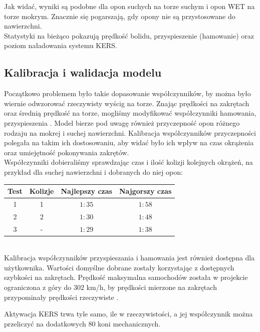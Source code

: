 \documentclass{article}
\begin{document}
Jak widać, wyniki są podobne dla opon suchych na torze suchym i opon WET na torze mokrym. Znacznie się pogarszają, gdy opony nie są przystosowane do nawierzchni. \\

Statystyki na bieżąco pokazują prędkość bolidu, przyspieszenie (hamowanie) oraz poziom naładowania systemu KERS.

\subsection{Kalibracja i walidacja modelu}

Początkowo problemem było takie dopasowanie współczynników, by można było wiernie odwzorować rzeczywisty wyścig na torze. Znając prędkości na zakrętach oraz średnią prędkość na torze, mogliśmy modyfikować współczynniki hamowania, przyspieszenia \cite{track}. Model bierze pod uwagę również przyczepność opon różnego rodzaju na mokrej i suchej nawierzchni. Kalibracja współczynników przyczepności polegała na takim ich dostosowaniu, aby widać było ich wpływ na czas okrążenia oraz umiejętność pokonywania zakrętów. \\

Współczynniki dobieraliśmy sprawdzając czas i ilość kolizji kolejnych okrążeń, na przykład dla suchej nawierzchni i dobranych do niej opon: \\

\begin{tabular}{c|c|c|c}
Test & Kolizje & Najlepszy czas & Najgorszy czas \\
\hline
1 & 1 & $1:35$ & $1:58$ \\
\hline
2 & 2 & $1:30$ & $1:48$ \\
\hline
3 & - & $1:29$ & $1:38$ \\
\end{tabular} \\

Kalibracja współczynników przyspieszania i hamowania jest również dostępna dla użytkownika. Wartości domyślne dobrane zostały korzystając z dostępnych szybkości na zakrętach. Prędkość maksymalna samochodów została w projekcie ograniczona z góry do $302$ km/h, by prędkości mierzone na zakrętach przypominały prędkości rzeczywiste \cite{fanatic}.

Aktywacja KERS trwa tyle samo, ile w rzeczywistości, a jej współczynnik można przeliczyć na dodatkowych $80$ koni mechanicznych.\\

\pagebreak
\end{document}
